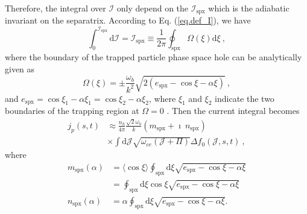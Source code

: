 Therefore, the integral over $\mathcal{I}$ only depend on the $\mathcal{I}_\mathrm{spx}$ which is the 
 adiabatic invariant on the separatrix. 
According to Eq. (\ref{eq.def_I}), we have
\begin{equation}
    \int^{\mathcal{I}_\mathrm{s p x}}_0 \mathrm{d}\mathcal{I} = \mathcal{I}_\mathrm{s p x} \equiv {\frac{1}{2\pi}} \oint_\mathrm{s p x} \Omega (\xi) \mathrm{d} \xi~,
\end{equation}
where the boundary of the trapped particle phase space hole can be analytically given as
\begin{equation}\label{eq.bound}
    \Omega(\xi) = \pm \frac{\omega_b}{k^2} \sqrt{2 (e_\mathrm{spx}-\cos \xi - \alpha \xi)}~,
\end{equation}
and $e_\mathrm{spx}= \cos\xi_1 - \alpha \xi_1 = \cos\xi_2 - \alpha \xi_2$, where $\xi_1$ and $\xi_2$ indicate the two boundaries of the trapping region at $\Omega = 0$ \cite{omura2008}.
Then the current integral becomes  
\begin{equation}\label{eq.adi_J}
    \begin{aligned}
    j_p(s,t) & \approx \frac{n_h }{4\pi} \frac{\sqrt{2} \omega_b}{k}  \left(m_\mathrm{s p x}+\imath ~ n_\mathrm{s p x}\right) \\
    & \times  \int \mathrm{d} \mathcal{J} \sqrt{ \omega_{c e}(\mathcal{J}+\Pi)} \Delta f_0(\mathcal{J},s,t) ~,
    \end{aligned}
\end{equation}
where
\begin{equation}\label{eq.function}
    \begin{aligned}
        m_\mathrm{spx}(\alpha) & = \langle  \cos \xi \rangle\oint_\mathrm{s p x} \mathrm{d} \xi \sqrt{e_\mathrm{s p x}-\cos \xi-\alpha \xi}
        \\
        & =\oint_\mathrm{s p x} \mathrm{d} \xi \cos \xi \sqrt{e_\mathrm{s p x}-\cos \xi-\alpha \xi}
        \\
        n_\mathrm{spx}(\alpha) &  = \alpha \oint_\mathrm{s p x} \mathrm{d} \xi \sqrt{e_\mathrm{s p x}-\cos \xi-\alpha \xi}.
    \end{aligned}
\end{equation}
